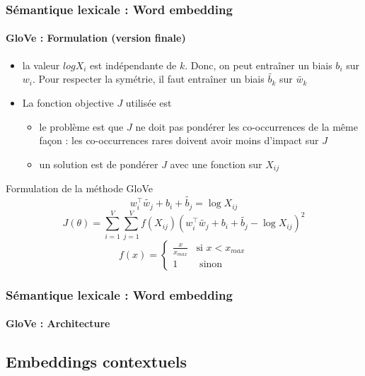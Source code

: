 \documentclass[xcolor=table]{beamer}
\begin{document}
\begin{frame}
\frametitle{Sémantique lexicale : Word embedding}
\framesubtitle{GloVe : Formulation (version finale)}
	
\begin{itemize}
	\item la valeur $log X_i$ est indépendante de $k$. Donc, on peut entraîner un biais $b_i$ sur $w_i$. Pour respecter la symétrie, il faut entraîner un biais $\tilde{b_k}$ sur $\tilde{w_k}$ 
	\item La fonction objective $J$ utilisée est 
	\begin{itemize}
		\item le problème est que $J$ ne doit pas pondérer les co-occurrences de la même façon : les co-occurrences rares doivent avoir moins d'impact sur $J$
		\item un solution est de pondérer $J$ avec une fonction sur $X_{ij}$
	\end{itemize}
\end{itemize}

\vspace{-6pt}
\begin{block}{Formulation de la méthode GloVe}\vspace{-6pt}
	\[w_i^\top \tilde{w_j} + b_i + \tilde{b_j} = \log X_{ij} \]
	\[J(\theta) = \sum_{i=1}^{V} \sum_{j=1}^{V} f(X_{ij}) (w_i^\top \tilde{w_j} + b_i + \tilde{b_j} - \log X_{ij})^2\]
	\vspace{-12pt}\[f(x) = \begin{cases}
	\frac{x}{x_{max}} & \text{si } x < x_{max} \\
	1 & \text{ sinon}
	\end{cases}\]
\vspace{-6pt}\end{block}
	
\end{frame}

\begin{frame}
\frametitle{Sémantique lexicale : Word embedding}
\framesubtitle{GloVe : Architecture}
	
\begin{center}
\end{center}
	
\end{frame}

\subsection{Embeddings contextuels}
\end{document}
